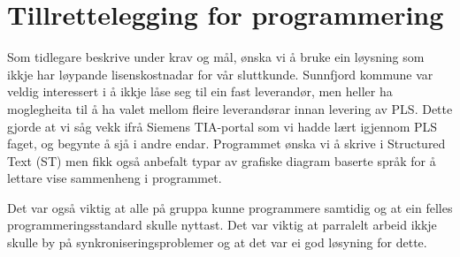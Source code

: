 \chapter{Tillrettelegging for programmering}
\thispagestyle{fancy}
\label{sec:5} 

Som tidlegare beskrive under krav og mål, ønska vi å bruke ein løysning som ikkje har løypande lisenskostnadar for vår sluttkunde. 
Sunnfjord kommune var veldig interessert i å ikkje låse seg til ein fast leverandør, men heller ha moglegheita til å ha valet mellom fleire 
leverandørar innan levering av PLS. Dette gjorde at vi såg vekk ifrå Siemens TIA-portal som vi hadde lært
igjennom PLS faget, og begynte å sjå i andre endar.
Programmet ønska vi å skrive i Structured Text (ST) men fikk også anbefalt typar av grafiske diagram baserte språk for å lettare
vise sammenheng i programmet.

Det var også viktig at alle på gruppa kunne programmere samtidig og at ein felles programmeringsstandard skulle nyttast.
Det var viktig at parralelt arbeid ikkje skulle by på synkroniseringsproblemer og at det var ei god løsyning for dette.
